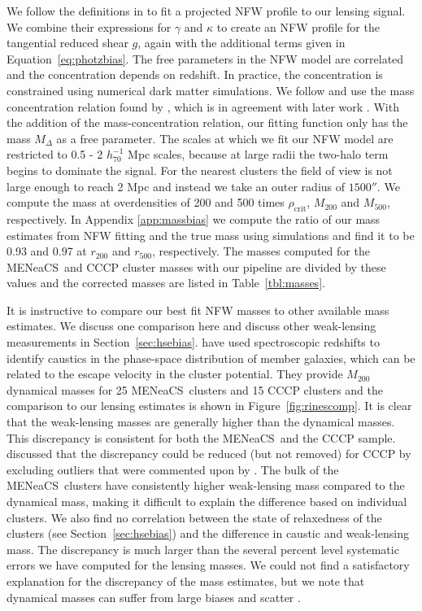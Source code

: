 \documentclass[useAMS,usenatbib]{mnras}
\newcommand{\mn}{MENeaCS}
\begin{document}
We follow the definitions in \cite{wright00} to fit a projected NFW profile to our lensing signal. We combine their expressions for $\gamma$ and $\kappa$ to create an NFW profile for the tangential reduced shear $g$, again with the additional terms given in Equation~\ref{eq:photzbias}. The free parameters in the NFW model are correlated and the concentration depends on redshift. In practice, the concentration is constrained using numerical dark matter simulations. We follow  and use the mass concentration relation found by \citet{duttonmaccio14}, which is in agreement with later work \citep{diemerkravtsov15}. With the addition of the mass-concentration relation, our fitting function only has the mass $M_\Delta$ as a free parameter. 
The scales at which we fit our NFW model are restricted to 0.5 - 2 $h_{70}^{-1}$ Mpc scales, because at large radii the two-halo term begins to dominate the signal. For the nearest clusters the field of view is not large enough to reach 2 Mpc and instead we take an outer radius of $1500''$.
We compute the mass at overdensities of 200 and 500 times $\rho_\mathrm{crit}$, $M_{200}$ and $M_{500}$, respectively. In Appendix \ref{app:massbias} we compute the ratio of our mass estimates from NFW fitting and the true mass using simulations and find it to be 0.93 and 0.97 at $r_{200}$ and $r_{500}$, respectively. The masses computed for the \mn \ and CCCP cluster masses with our pipeline are divided by these values and the corrected masses are listed in Table~\ref{tbl:masses}. 


It is instructive to compare our best fit NFW masses to other available mass estimates. We discuss one comparison here and discuss other weak-lensing measurements in Section~\ref{sec:hsebias}. \citet{rines16} have used spectroscopic redshifts to identify caustics in the phase-space distribution of member galaxies, which can be related to the escape velocity in the cluster potential. They provide $M_{200}$ dynamical masses for 25 \mn \ clusters and 15 CCCP clusters and the comparison to our lensing estimates is shown in Figure~\ref{fig:rinescomp}.
It is clear that the weak-lensing masses are generally higher than the dynamical masses. This discrepancy is consistent for both the \mn \ and the CCCP sample.  discussed that the discrepancy could be reduced (but not removed) for CCCP by excluding outliers that were commented upon by \citet{rines13}. The bulk of the \mn \ clusters have consistently higher weak-lensing mass compared to the dynamical mass, making it difficult to explain the difference based on individual clusters. We also find no correlation between the state of relaxedness of the clusters (see Section~\ref{sec:hsebias}) and the difference in caustic and weak-lensing mass. The discrepancy is much larger than the several percent level systematic errors we have computed for the lensing masses. We could not find a satisfactory explanation for the discrepancy of the mass estimates, but we note that dynamical masses can suffer from large biases and scatter \citep{old15, old18,armitage18}.
\end{document}
